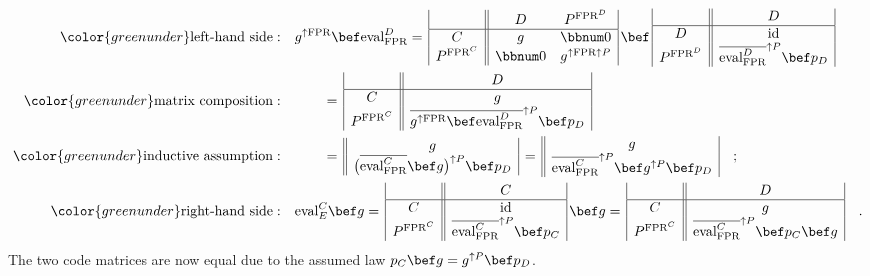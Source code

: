 \begin{align*}
{\color{greenunder}\text{left-hand side}:}\quad & g^{\uparrow\text{FPR}}\bef\text{eval}_{\text{FPR}}^{D}=\,\begin{array}{|c||cc|}
 & D & P^{\text{FPR}^{D}}\\
\hline C & g & \bbnum 0\\
P^{\text{FPR}^{C}} & \bbnum 0 & g^{\uparrow\text{FPR}\uparrow P}
\end{array}\,\bef\,\begin{array}{|c||c|}
 & D\\
\hline D & \text{id}\\
P^{\text{FPR}^{D}} & \overline{\text{eval}_{\text{FPR}}^{D}}^{\uparrow P}\bef p_{D}
\end{array}\\
{\color{greenunder}\text{matrix composition}:}\quad & \quad\quad=\,\begin{array}{|c||c|}
 & D\\
\hline C & g\\
P^{\text{FPR}^{C}} & \overline{g^{\uparrow\text{FPR}}\bef\text{eval}_{\text{FPR}}^{D}}^{\uparrow P}\bef p_{D}
\end{array}\\
{\color{greenunder}\text{inductive assumption}:}\quad & \quad\quad=\,\begin{array}{||c|}
g\\
\big(\overline{\text{eval}_{\text{FPR}}^{C}}\bef g\big)^{\uparrow P}\bef p_{D}
\end{array}\,=\,\begin{array}{||c|}
g\\
\overline{\text{eval}_{\text{FPR}}^{C}}^{\uparrow P}\bef g^{\uparrow P}\bef p_{D}
\end{array}\quad;\\
{\color{greenunder}\text{right-hand side}:}\quad & \text{eval}_{E}^{C}\bef g=\,\begin{array}{|c||c|}
 & C\\
\hline C & \text{id}\\
P^{\text{FPR}^{C}} & \overline{\text{eval}_{\text{FPR}}^{C}}^{\uparrow P}\bef p_{C}
\end{array}\,\bef g=\,\begin{array}{|c||c|}
 & D\\
\hline C & g\\
P^{\text{FPR}^{C}} & \overline{\text{eval}_{\text{FPR}}^{C}}^{\uparrow P}\bef p_{C}\bef g
\end{array}\quad.
\end{align*}
The two code matrices are now equal due to the assumed law $p_{C}\bef g=g^{\uparrow P}\bef p_{D}$.

